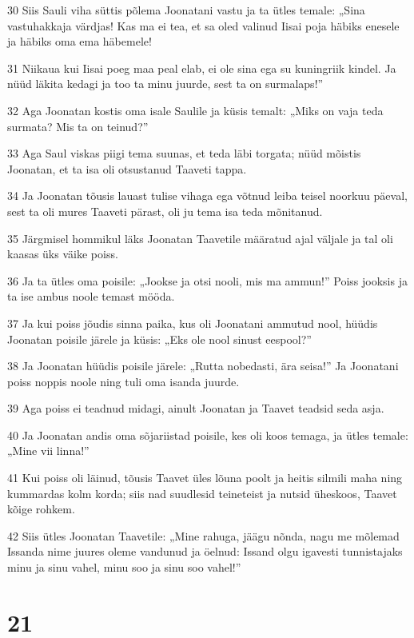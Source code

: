\par 30 Siis Sauli viha süttis põlema Joonatani vastu ja ta ütles temale: „Sina vastuhakkaja värdjas! Kas ma ei tea, et sa oled valinud Iisai poja häbiks enesele ja häbiks oma ema häbemele!
\par 31 Niikaua kui Iisai poeg maa peal elab, ei ole sina ega su kuningriik kindel. Ja nüüd läkita kedagi ja too ta minu juurde, sest ta on surmalaps!”
\par 32 Aga Joonatan kostis oma isale Saulile ja küsis temalt: „Miks on vaja teda surmata? Mis ta on teinud?”
\par 33 Aga Saul viskas piigi tema suunas, et teda läbi torgata; nüüd mõistis Joonatan, et ta isa oli otsustanud Taaveti tappa.
\par 34 Ja Joonatan tõusis lauast tulise vihaga ega võtnud leiba teisel noorkuu päeval, sest ta oli mures Taaveti pärast, oli ju tema isa teda mõnitanud.
\par 35 Järgmisel hommikul läks Joonatan Taavetile määratud ajal väljale ja tal oli kaasas üks väike poiss.
\par 36 Ja ta ütles oma poisile: „Jookse ja otsi nooli, mis ma ammun!” Poiss jooksis ja ta ise ambus noole temast mööda.
\par 37 Ja kui poiss jõudis sinna paika, kus oli Joonatani ammutud nool, hüüdis Joonatan poisile järele ja küsis: „Eks ole nool sinust eespool?”
\par 38 Ja Joonatan hüüdis poisile järele: „Rutta nobedasti, ära seisa!” Ja Joonatani poiss noppis noole ning tuli oma isanda juurde.
\par 39 Aga poiss ei teadnud midagi, ainult Joonatan ja Taavet teadsid seda asja.
\par 40 Ja Joonatan andis oma sõjariistad poisile, kes oli koos temaga, ja ütles temale: „Mine vii linna!”
\par 41 Kui poiss oli läinud, tõusis Taavet üles lõuna poolt ja heitis silmili maha ning kummardas kolm korda; siis nad suudlesid teineteist ja nutsid üheskoos, Taavet kõige rohkem.
\par 42 Siis ütles Joonatan Taavetile: „Mine rahuga, jäägu nõnda, nagu me mõlemad Issanda nime juures oleme vandunud ja öelnud: Issand olgu igavesti tunnistajaks minu ja sinu vahel, minu soo ja sinu soo vahel!”

\chapter{21}

